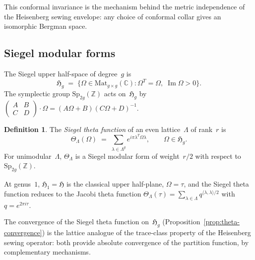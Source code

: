 \documentclass[11pt,reqno]{amsart}
\theoremstyle{definition}
\newtheorem{definition}[theorem]{Definition}
\theoremstyle{remark}
\newcommand{\bC}{\mathbb{C}}
\newcommand{\bZ}{\mathbb{Z}}
\newcommand{\fH}{\mathfrak{H}}
\numberwithin{equation}{section}
\begin{document}
This conformal invariance is the mechanism behind the metric
independence of the Heisenberg sewing envelope: any choice of
conformal collar gives an isomorphic Bergman space.

\subsection{Siegel modular forms}\label{app:siegel}

The Siegel upper half-space of degree~$g$ is
\[
\fH_g
\;=\;
\{\Omega \in \mathrm{Mat}_{g \times g}(\bC) :
\Omega^T = \Omega,\;
\operatorname{Im}\Omega > 0\}.
\]
The symplectic group
$\mathrm{Sp}_{2g}(\bZ)$ acts on~$\fH_g$ by
$\begin{pmatrix}A&B\\C&D\end{pmatrix}
\cdot \Omega = (A\Omega+B)(C\Omega+D)^{-1}$.

\begin{definition}\label{def:siegel-theta}
The \emph{Siegel theta function} of an even lattice~$\Lambda$
of rank~$r$ is
\[
\Theta_\Lambda(\Omega)
\;=\;
\sum_{\lambda \in \Lambda^g}
e^{i\pi\lambda^T\Omega\lambda},
\qquad \Omega \in \fH_g.
\]
For unimodular~$\Lambda$, $\Theta_\Lambda$ is a Siegel modular
form of weight~$r/2$ with respect to
$\mathrm{Sp}_{2g}(\bZ)$.
\end{definition}

At genus~$1$, $\fH_1 = \fH$ is the classical upper half-plane,
$\Omega = \tau$, and the Siegel theta function reduces to the
Jacobi theta function
$\Theta_\Lambda(\tau)
= \sum_{\lambda \in \Lambda} q^{\langle\lambda,\lambda\rangle/2}$
with $q = e^{2\pi i\tau}$.

The convergence of the Siegel theta function on~$\fH_g$
(Proposition~\ref{prop:theta-convergence}) is the lattice
analogue of the trace-class property of the Heisenberg sewing
operator: both provide absolute convergence of the partition
function, by complementary mechanisms.
\end{document}
